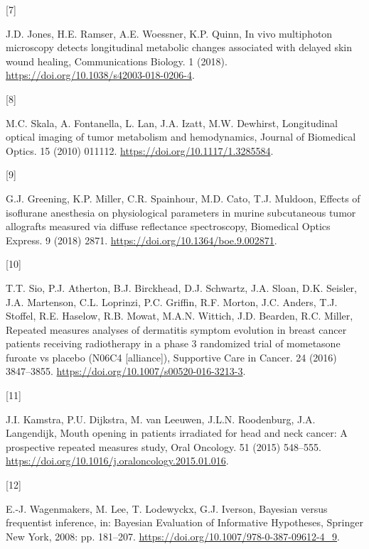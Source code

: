 \documentclass[
]{article}
\newlength{\cslhangindent}
\newlength{\csllabelwidth}
\newlength{\cslentryspacingunit} %
\newenvironment{CSLReferences}[2] %
 {%
  \setlength{\parindent}{0pt}
  \ifodd #1
  \let\oldpar\par
  \def\par{\hangindent=\cslhangindent\oldpar}
  \fi
  \setlength{\parskip}{#2\cslentryspacingunit}
 }%
 {}
\newcommand{\CSLLeftMargin}[1]{\parbox[t]{\csllabelwidth}{#1}}
\newcommand{\CSLRightInline}[1]{\parbox[t]{\linewidth - \csllabelwidth}{#1}\break}
\begin{document}
\begin{CSLReferences}{0}{0}
\leavevmode{}%
\CSLLeftMargin{{[}7{]} }
\CSLRightInline{J.D. Jones, H.E. Ramser, A.E. Woessner, K.P. Quinn, In vivo multiphoton microscopy detects longitudinal metabolic changes associated with delayed skin wound healing, Communications Biology. 1 (2018). \url{https://doi.org/10.1038/s42003-018-0206-4}.}

\leavevmode{}%
\CSLLeftMargin{{[}8{]} }
\CSLRightInline{M.C. Skala, A. Fontanella, L. Lan, J.A. Izatt, M.W. Dewhirst, Longitudinal optical imaging of tumor metabolism and hemodynamics, Journal of Biomedical Optics. 15 (2010) 011112. \url{https://doi.org/10.1117/1.3285584}.}

\leavevmode{}%
\CSLLeftMargin{{[}9{]} }
\CSLRightInline{G.J. Greening, K.P. Miller, C.R. Spainhour, M.D. Cato, T.J. Muldoon, Effects of isoflurane anesthesia on physiological parameters in murine subcutaneous tumor allografts measured via diffuse reflectance spectroscopy, Biomedical Optics Express. 9 (2018) 2871. \url{https://doi.org/10.1364/boe.9.002871}.}

\leavevmode{}%
\CSLLeftMargin{{[}10{]} }
\CSLRightInline{T.T. Sio, P.J. Atherton, B.J. Birckhead, D.J. Schwartz, J.A. Sloan, D.K. Seisler, J.A. Martenson, C.L. Loprinzi, P.C. Griffin, R.F. Morton, J.C. Anders, T.J. Stoffel, R.E. Haselow, R.B. Mowat, M.A.N. Wittich, J.D. Bearden, R.C. Miller, Repeated measures analyses of dermatitis symptom evolution in breast cancer patients receiving radiotherapy in a phase 3 randomized trial of mometasone furoate vs placebo (N06C4 {[}alliance{]}), Supportive Care in Cancer. 24 (2016) 3847--3855. \url{https://doi.org/10.1007/s00520-016-3213-3}.}

\leavevmode{}%
\CSLLeftMargin{{[}11{]} }
\CSLRightInline{J.I. Kamstra, P.U. Dijkstra, M. van Leeuwen, J.L.N. Roodenburg, J.A. Langendijk, Mouth opening in patients irradiated for head and neck cancer: A prospective repeated measures study, Oral Oncology. 51 (2015) 548--555. \url{https://doi.org/10.1016/j.oraloncology.2015.01.016}.}

\leavevmode{}%
\CSLLeftMargin{{[}12{]} }
\CSLRightInline{E.-J. Wagenmakers, M. Lee, T. Lodewyckx, G.J. Iverson, Bayesian versus frequentist inference, in: Bayesian Evaluation of Informative Hypotheses, Springer New York, 2008: pp. 181--207. \url{https://doi.org/10.1007/978-0-387-09612-4_9}.}


\end{CSLReferences}
\end{document}
